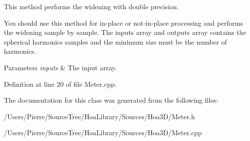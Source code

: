 This method performs the widening with double precision. 

You should use this method for in-\/place or not-\/in-\/place processing and performs the widening sample by sample. The inputs array and outputs array contains the spherical harmonics samples and the minimum size must be the number of harmonics.


\begin{DoxyParams}{Parameters}
{\em inputs} & The input array. \\
\hline
\end{DoxyParams}


Definition at line 20 of file Meter.\-cpp.



The documentation for this class was generated from the following files\-:\begin{DoxyCompactItemize}
\item 
/\-Users/\-Pierre/\-Source\-Tree/\-Hoa\-Library/\-Sources/\-Hoa3\-D/Meter.\-h\item 
/\-Users/\-Pierre/\-Source\-Tree/\-Hoa\-Library/\-Sources/\-Hoa3\-D/Meter.\-cpp\end{DoxyCompactItemize}
